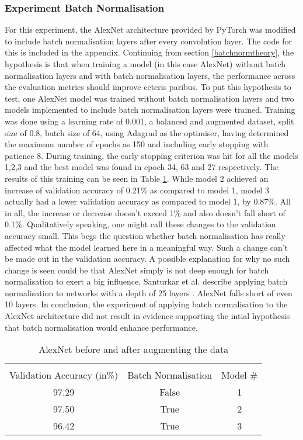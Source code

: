 \subsubsection{Experiment Batch Normalisation}
For this experiment, the AlexNet architecture provided by PyTorch \cite{pytorchAlexNet} was modified to include batch normalisation layers after every convolution layer. The code for this is included in the appendix. Continuing from section \ref{batchnormtheory}, the hypothesis is that when training a model (in this case AlexNet) without batch normalisation layers and with batch normalisation layers, the performance across the evaluation metrics should improve ceteris paribus. To put this hypothesis to test, one AlexNet model was trained without batch normalisation layers and two models implemented to include batch normalisation layers were trained. Training was done using a learning rate of 0.001, a balanced and augmented dataset, split size of 0.8, batch size of 64, using Adagrad as the optimiser, having determined the maximum number of epochs as 150 and including early stopping with patience 8. During training, the early stopping criterion was hit for all the models 1,2,3 and the best model was found in epoch 34, 63 and 27 respectively. The results of this training can be seen in Table \ref{batchnorm-table}. While model 2 achieved an increase of validation accuracy of 0.21\% as compared to model 1, model 3 actually had a lower validation accuracy as compared to model 1, by 0.87\%. All in all, the increase or decrease doesn't exceed 1\% and also doesn't fall short of 0.1\%. Qualitatively speaking, one might call these changes to the validation accuracy small. This begs the question whether batch normalisation has really affected what the model learned here in a meaningful way. Such a change can't be made out in the validation accuracy. A possible explanation for why no such change is seen could be that AlexNet simply is not deep enough for batch normalisation to exert a big influence. Santurkar et al. describe applying batch normalisation to networks with a depth of 25 layers \citep{santurkar2018does}. AlexNet falls short of even 10 layers. In conclusion, the experiment of applying batch normalisation to the AlexNet architecture did not result in evidence supporting the intial hypothesis that batch normalisation would enhance performance.
\begin{table}[h]
	\caption{AlexNet before and after augmenting the data}\label{batchnorm-table}
	\centering
	\begin{tabular}{ccc}
		\toprule
		\multicolumn{3}{c}{} \\
		Validation Accuracy (in\%)     & Batch Normalisation    &     Model  \# \\
		\midrule
		97.29    &    False    &    1\\
		97.50   &    True    &    2\\
		96.42    &    True    &    3 \\
		\bottomrule
	\end{tabular}
\end{table}





